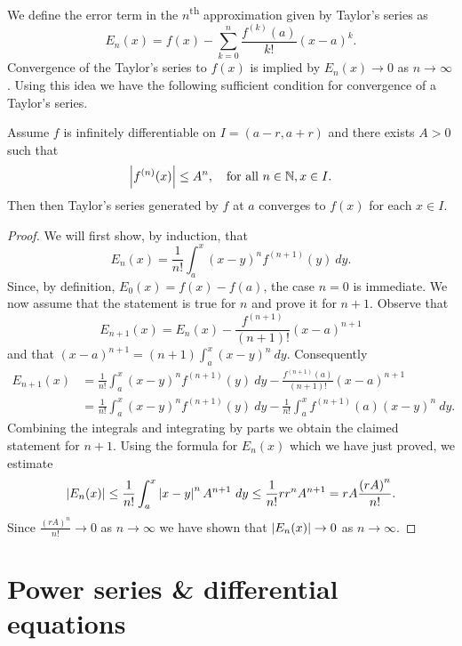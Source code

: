 We define the error term in the \(n\)\textsuperscript{th} approximation given by Taylor's series as
\[
  E_n(x) = f(x) - \sum_{k=0}^{n} \frac{f^{(k)}(a)}{k!}{(x-a)}^k.
\]
Convergence of the Taylor's series to \(f(x)\) is implied by \(E_n(x) \to 0\) as \(n\to \infty\).
Using this idea we have the following sufficient condition for convergence of a Taylor's series.

\begin{theorem}
  Assume \(f\) is infinitely differentiable on \(I=(a-r,a+r)\) and there exists \(A>0\) such that
  \[
    \left|f^{(n)}(x)\right|\leq A^n, \quad \text{for all \(n\in \mathbb{N}, x\in I\)}.
  \]
  Then then Taylor's series generated by \(f\) at \(a\) converges to \(f(x)\) for each \(x\in I\).
\end{theorem}

\begin{proof}
  We will first show, by induction, that
  \[
    E_n(x) = \frac{1}{n!} \int_{a}^{x} {(x-y)}^n f^{(n+1)}(y) \ dy.
  \]
  Since, by definition, \(E_0(x) = f(x) - f(a) \), the case \(n=0\) is immediate.
  We now assume that the statement is true for \(n\) and prove it for \(n+1\).
  Observe that
  \[
    E_{n+1}(x) = E_{n}(x) -   \frac{f^{(n+1)}}{(n+1)!}{(x-a)}^{n+1}
  \]
  and that \({(x-a)}^{n+1} = (n+1) \int_{a}^{x}{(x-y)}^n \ dy\).
  Consequently
  \[
    \begin{aligned}
      E_{n+1}(x)
       & =
      \frac{1}{n!} \int_{a}^{x} {(x-y)}^n f^{(n+1)}(y) \ dy
      -   \frac{f^{(n+1)}(a)}{(n+1)!}{(x-a)}^{n+1} \\
       & =
      \frac{1}{n!} \int_{a}^{x} {(x-y)}^n f^{(n+1)}(y) \ dy
      - \frac{1}{n!}  \int_{a}^{x} f^{(n+1)}(a)  {(x-y)}^n \ dy.
    \end{aligned}
  \]
  Combining the integrals and integrating by parts we obtain the claimed statement for \(n+1\).
  Using the formula for \(E_n(x)\) which we have just proved, we estimate
  \[
    \left|E_n(x)\right|
    \leq \frac{1}{n!} \int_{a}^{x} \left|x-y\right|^n A^{n+1}  \ dy
    \leq \frac{1}{n!} r r^n  A^{n+1} = rA \frac{{(rA)}^n}{n!}.
  \]
  Since \(\frac{{(rA)}^n}{n!} \to 0\) as \(n\to \infty\) we have shown that \(\left|E_n(x)\right|  \to 0\) as \(n\to \infty\).
\end{proof}



\section{Power series \& differential equations}

